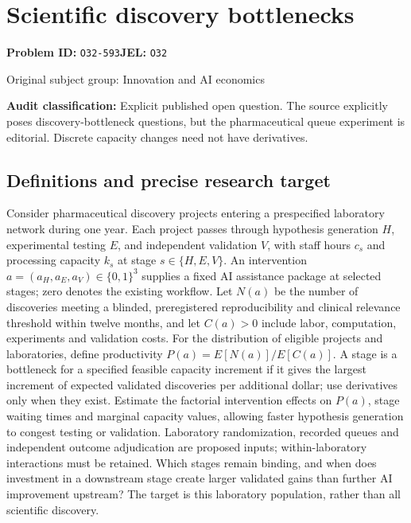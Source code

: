 \documentclass[11pt,a4paper]{article}
\begin{document}
\section*{Scientific discovery bottlenecks}
\textbf{Problem ID:} \texttt{O32-593}\quad \textbf{JEL:} \texttt{O32}\par
\label{problem:OP-0410}
{\sffamily\small\color{muted}Original subject group: Innovation and AI economics\par}
\label{definitions:problem:30007692}
\textbf{Audit classification:} Explicit published open question. The source explicitly poses discovery-bottleneck questions, but the pharmaceutical queue experiment is editorial. Discrete capacity changes need not have derivatives.
\subsection*{Definitions and precise research target}
Consider pharmaceutical discovery projects entering a prespecified laboratory network during one year. Each project passes through hypothesis generation \(H\), experimental testing \(E\), and independent validation \(V\), with staff hours \(c_s\) and processing capacity \(k_s\) at stage \(s\in\{H,E,V\}\). An intervention \(a=(a_H,a_E,a_V)\in\{0,1\}^3\) supplies a fixed AI assistance package at selected stages; zero denotes the existing workflow. Let \(N(a)\) be the number of discoveries meeting a blinded, preregistered reproducibility and clinical relevance threshold within twelve months, and let \(C(a)>0\) include labor, computation, experiments and validation costs. For the distribution of eligible projects and laboratories, define productivity \(P(a)=E[N(a)]/E[C(a)]\). A stage is a bottleneck for a specified feasible capacity increment if it gives the largest increment of expected validated discoveries per additional dollar; use derivatives only when they exist. Estimate the factorial intervention effects on \(P(a)\), stage waiting times and marginal capacity values, allowing faster hypothesis generation to congest testing or validation. Laboratory randomization, recorded queues and independent outcome adjudication are proposed inputs; within-laboratory interactions must be retained. Which stages remain binding, and when does investment in a downstream stage create larger validated gains than further AI improvement upstream? The target is this laboratory population, rather than all scientific discovery.
\end{document}
